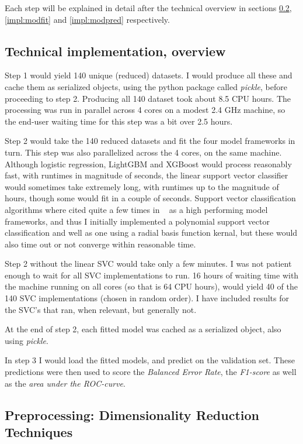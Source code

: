 \documentclass[12pt]{article}
\begin{document}
Each step will be explained in detail after the technical overview in sections \ref{impl:dimred}, \ref{impl:modfit} and \ref{impl:modpred} respectively.

\subsection{Technical implementation, overview}

Step 1 would yield 140 unique (reduced) datasets. I would produce all these and cache them as serialized objects, using the python package called \emph{pickle}, before proceeding to step 2. Producing all 140 dataset took about 8.5 CPU hours. The processing was run in parallel across 4 cores on a modest 2.4 GHz machine, so the end-user waiting time for this step was a bit over 2.5 hours.

Step 2 would take the 140 reduced datasets and fit the four model frameworks in turn. This step was also parallelized across the 4 cores, on the same machine. Although logistic regression, LightGBM and XGBoost would process reasonably fast, with runtimes in magnitude of seconds, the linear support vector classifier would sometimes take extremely long, with runtimes up to the magnitude of hours, though some would fit in a couple of seconds. Support vector classification algorithms where cited quite a few times in ~\cite{nips03book} as a high performing model frameworks, and thus I initially implemented a polynomial support vector classification and well as one using a radial basis function kernal, but these would also time out or not converge within reasonable time.

Step 2 without the linear SVC would take only a few minutes. I was not patient enough to wait for all SVC implementations to run. 16 hours of waiting time with the machine running on all cores (so that is 64 CPU hours), would yield 40 of the 140 SVC implementations (chosen in random order). I have included results for the SVC's that ran, when relevant, but generally not.

At the end of step 2, each fitted model was cached as a serialized object, also using \emph{pickle}.

In step 3 I would load the fitted models, and predict on the validation set. These predictions were then used to score the \emph{Balanced Error Rate}, the \emph{F1-score} as well as the \emph{area under the ROC-curve}.


\subsection{Preprocessing: Dimensionality Reduction Techniques}\label{impl:dimred}
\end{document}
